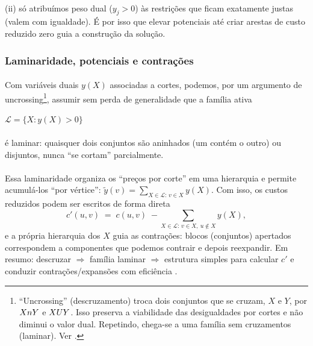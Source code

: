\documentclass[12pt,a4paper]{article}
\def\emph#1{#1}%
\def\cup{\string U}%
\def\cap{\string n}%
\begin{document}
\paragraph{}
(ii) só atribuímos peso dual (\(y_j>0\)) às restrições que ficam exatamente justas (valem com igualdade). É por isso que elevar potenciais até criar arestas de custo reduzido zero guia a construção da solução.

\subsubsection{Laminaridade, potenciais e contrações}

\paragraph{}
Com variáveis duais \(y(X)\) associadas a cortes, podemos, por um argumento de \emph{uncrossing}\footnote{“Uncrossing” (descruzamento) troca dois conjuntos que se cruzam, \(X\) e \(Y\), por \(X\cap Y\) e \(X\cup Y\). Isso preserva a viabilidade das desigualdades por cortes e não diminui o valor dual. Repetindo, chega-se a uma família sem cruzamentos (\emph{laminar}). Ver \cite{schrijver2003comb,frank2014}.}, assumir sem perda de generalidade que a família ativa

\(\mathcal{L}=\{X\colon y(X)>0\}\)

\paragraph{}
é \emph{laminar}: quaisquer dois conjuntos são aninhados (um contém o outro) ou disjuntos, nunca “se cortam” parcialmente.

\paragraph{}
Essa laminaridade organiza os “preços por corte” em uma hierarquia e permite acumulá-los “por vértice”: \(\tilde y(v)=\sum_{X\in\mathcal{L}:\,v\in X} y(X)\). Com isso, os custos reduzidos podem ser escritos de forma direta
\[
    c'(u,v)\;=\; c(u,v)\; -\! \sum_{X\in\mathcal{L}:\, v\in X,\ u\notin X} y(X),
\]
e a própria hierarquia dos \(X\) guia as contrações: blocos (conjuntos) \emph{apertados} correspondem a componentes que podemos contrair e depois reexpandir. Em resumo: descruzar \(\Rightarrow\) família laminar \(\Rightarrow\) estrutura simples para calcular \(c'\) e conduzir contrações/expansões com eficiência \cite{frank2014,schrijver2003comb}.
\end{document}
